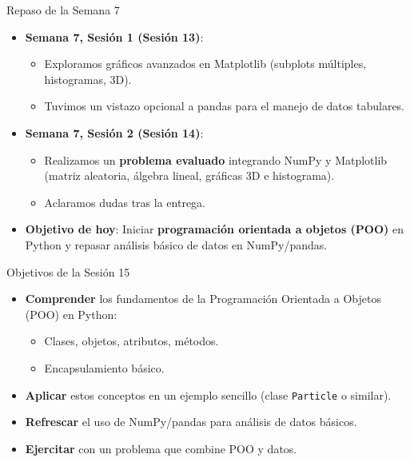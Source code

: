 \documentclass[10pt]{beamer}
\begin{document}
\begin{frame}{Repaso de la Semana 7}
  \begin{itemize}
    \item \textbf{Semana 7, Sesión 1 (Sesión 13)}:
      \begin{itemize}
        \item Exploramos gráficos avanzados en Matplotlib (subplots múltiples, histogramas, 3D).
        \item Tuvimos un vistazo opcional a pandas para el manejo de datos tabulares.
      \end{itemize}
    \item \textbf{Semana 7, Sesión 2 (Sesión 14)}:
      \begin{itemize}
        \item Realizamos un \textbf{problema evaluado} integrando NumPy y Matplotlib (matriz aleatoria, álgebra lineal, gráficas 3D e histograma).
        \item Aclaramos dudas tras la entrega.
      \end{itemize}
    \item \textbf{Objetivo de hoy}: Iniciar \textbf{programación orientada a objetos (POO)} en Python y repasar análisis básico de datos en NumPy/pandas.
  \end{itemize}
\end{frame}

\begin{frame}{Objetivos de la Sesión 15}
  \begin{itemize}
    \item \textbf{Comprender} los fundamentos de la Programación Orientada a Objetos (POO) en Python:
      \begin{itemize}
        \item Clases, objetos, atributos, métodos.
        \item Encapsulamiento básico.
      \end{itemize}
    \item \textbf{Aplicar} estos conceptos en un ejemplo sencillo (clase \texttt{Particle} o similar).
    \item \textbf{Refrescar} el uso de NumPy/pandas para análisis de datos básicos.
    \item \textbf{Ejercitar} con un problema que combine POO y datos.
  \end{itemize}
\end{frame}
\end{document}
